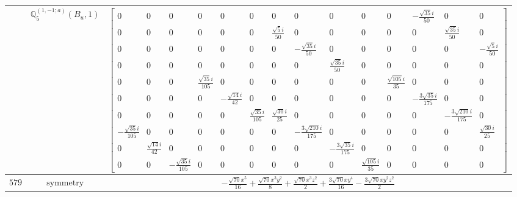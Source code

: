 \documentclass[fleqn,8pt,landscape]{jsarticle}
\begin{document}
\begin{longtable}{ccc}
$  $ & $ \mathbb{Q}_{5}^{(1,-1;a)}(B_{u},1) $ & $ \begin{bmatrix} 0 & 0 & 0 & 0 & 0 & 0 & 0 & 0 & 0 & 0 & 0 & - \frac{\sqrt{35} i}{50} & 0 & 0 \\ 0 & 0 & 0 & 0 & 0 & 0 & \frac{\sqrt{5} i}{50} & 0 & 0 & 0 & 0 & 0 & \frac{\sqrt{35} i}{50} & 0 \\ 0 & 0 & 0 & 0 & 0 & 0 & 0 & - \frac{\sqrt{35} i}{50} & 0 & 0 & 0 & 0 & 0 & - \frac{\sqrt{5} i}{50} \\ 0 & 0 & 0 & 0 & 0 & 0 & 0 & 0 & \frac{\sqrt{35} i}{50} & 0 & 0 & 0 & 0 & 0 \\ 0 & 0 & 0 & \frac{\sqrt{35} i}{105} & 0 & 0 & 0 & 0 & 0 & 0 & \frac{\sqrt{105} i}{35} & 0 & 0 & 0 \\ 0 & 0 & 0 & 0 & - \frac{\sqrt{14} i}{42} & 0 & 0 & 0 & 0 & 0 & 0 & - \frac{3 \sqrt{35} i}{175} & 0 & 0 \\ 0 & 0 & 0 & 0 & 0 & \frac{\sqrt{35} i}{105} & \frac{\sqrt{30} i}{25} & 0 & 0 & 0 & 0 & 0 & - \frac{3 \sqrt{210} i}{175} & 0 \\ - \frac{\sqrt{35} i}{105} & 0 & 0 & 0 & 0 & 0 & 0 & - \frac{3 \sqrt{210} i}{175} & 0 & 0 & 0 & 0 & 0 & \frac{\sqrt{30} i}{25} \\ 0 & \frac{\sqrt{14} i}{42} & 0 & 0 & 0 & 0 & 0 & 0 & - \frac{3 \sqrt{35} i}{175} & 0 & 0 & 0 & 0 & 0 \\ 0 & 0 & - \frac{\sqrt{35} i}{105} & 0 & 0 & 0 & 0 & 0 & 0 & \frac{\sqrt{105} i}{35} & 0 & 0 & 0 & 0 \end{bmatrix} $ \\ \hline
$ 579 $ & $ \text{symmetry} $ & $ - \frac{\sqrt{70} x^{5}}{16} + \frac{\sqrt{70} x^{3} y^{2}}{8} + \frac{\sqrt{70} x^{3} z^{2}}{2} + \frac{3 \sqrt{70} x y^{4}}{16} - \frac{3 \sqrt{70} x y^{2} z^{2}}{2} $ \\

\end{longtable}
\end{document}
